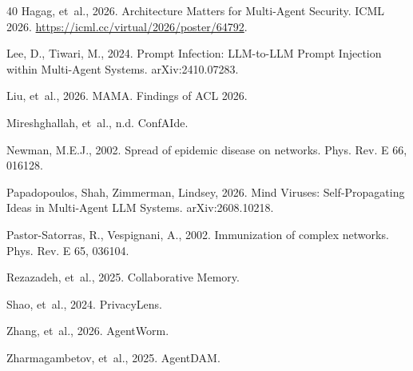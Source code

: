 \documentclass[preprint,12pt,authoryear]{elsarticle}
\begin{document}
\begin{thebibliography}{40}
Hagag, et~al., 2026. Architecture Matters for Multi-Agent Security. ICML 2026. \url{https://icml.cc/virtual/2026/poster/64792}.

Lee, D., Tiwari, M., 2024. Prompt Infection: LLM-to-LLM Prompt Injection within Multi-Agent Systems. arXiv:2410.07283.

Liu, et~al., 2026. MAMA. Findings of ACL 2026.

Mireshghallah, et~al., n.d. ConfAIde.

Newman, M.E.J., 2002. Spread of epidemic disease on networks. Phys. Rev. E 66, 016128.

Papadopoulos, Shah, Zimmerman, Lindsey, 2026. Mind Viruses: Self-Propagating Ideas in Multi-Agent LLM Systems. arXiv:2608.10218.

Pastor-Satorras, R., Vespignani, A., 2002. Immunization of complex networks. Phys. Rev. E 65, 036104.

Rezazadeh, et~al., 2025. Collaborative Memory.

Shao, et~al., 2024. PrivacyLens.

Zhang, et~al., 2026. AgentWorm.

Zharmagambetov, et~al., 2025. AgentDAM.

\end{thebibliography}
\end{document}
